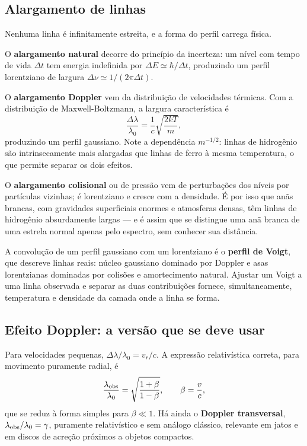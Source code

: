 \documentclass[11pt,a4paper]{article}
\begin{document}
\subsection*{Alargamento de linhas}

Nenhuma linha é infinitamente estreita, e a forma do perfil carrega física.

O \textbf{alargamento natural} decorre do princípio da incerteza: um nível com tempo de vida $\Delta t$ tem energia indefinida por $\Delta E\simeq\hbar/\Delta t$, produzindo um perfil lorentziano de largura $\Delta\nu\simeq1/(2\pi\Delta t)$.

O \textbf{alargamento Doppler} vem da distribuição de velocidades térmicas. Com a distribuição de Maxwell-Boltzmann, a largura característica é
\[
\frac{\Delta\lambda}{\lambda_0}=\frac{1}{c}\sqrt{\frac{2kT}{m}},
\]
produzindo um perfil gaussiano. Note a dependência $m^{-1/2}$: linhas de hidrogênio são intrinsecamente mais alargadas que linhas de ferro à mesma temperatura, o que permite separar os dois efeitos.

O \textbf{alargamento colisional} ou de pressão vem de perturbações dos níveis por partículas vizinhas; é lorentziano e cresce com a densidade. É por isso que anãs brancas, com gravidades superficiais enormes e atmosferas densas, têm linhas de hidrogênio absurdamente largas --- e é assim que se distingue uma anã branca de uma estrela normal apenas pelo espectro, sem conhecer sua distância.

A convolução de um perfil gaussiano com um lorentziano é o \textbf{perfil de Voigt}, que descreve linhas reais: núcleo gaussiano dominado por Doppler e asas lorentzianas dominadas por colisões e amortecimento natural. Ajustar um Voigt a uma linha observada e separar as duas contribuições fornece, simultaneamente, temperatura e densidade da camada onde a linha se forma.

\subsection*{Efeito Doppler: a versão que se deve usar}

Para velocidades pequenas, $\Delta\lambda/\lambda_0=v_r/c$. A expressão relativística correta, para movimento puramente radial, é
\[
\frac{\lambda_{\rm obs}}{\lambda_0}=\sqrt{\frac{1+\beta}{1-\beta}},\qquad \beta=\frac{v}{c},
\]
que se reduz à forma simples para $\beta\ll1$. Há ainda o \textbf{Doppler transversal}, $\lambda_{\rm obs}/\lambda_0=\gamma$, puramente relativístico e sem análogo clássico, relevante em jatos e em discos de acreção próximos a objetos compactos.
\end{document}
